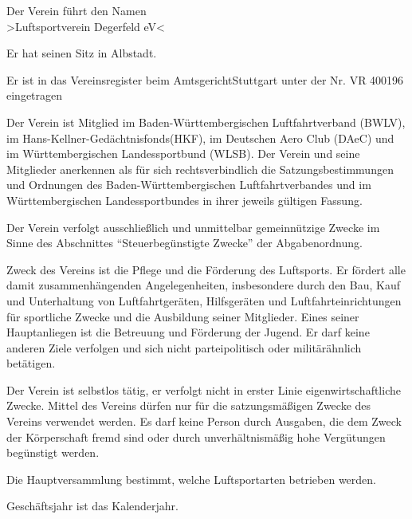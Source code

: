 \documentclass[11pt,a4paper,parskip=half]{scrartcl}
\begin{document}
	\begin{contract}
		\begin{multicols}{2}
		
		Der Verein führt den Namen\\
		>Luftsportverein Degerfeld eV<
		
		Er hat seinen Sitz in Albstadt.
		
		Er ist in das Vereinsregister beim AmtsgerichtStuttgart unter der Nr. VR 400196 eingetragen
		
		Der Verein ist Mitglied im Baden-Württembergischen Luftfahrtverband (BWLV), im Hans-Kellner-Gedächtnisfonds(HKF), im Deutschen		Aero Club (DAeC) und im Württembergischen
		Landessportbund (WLSB). Der Verein und seine		Mitglieder anerkennen als für sich
		rechtsverbindlich die Satzungsbestimmungen und		Ordnungen des Baden-Württembergischen
		Luftfahrtverbandes und im Württembergischen		Landessportbundes in ihrer jeweils gültigen
		Fassung.
		
		Der Verein verfolgt ausschließlich und		unmittelbar
		gemeinnützige Zwecke im Sinne des Abschnittes		"`Steuerbegünstigte Zwecke"' der Abgabenordnung.
		
		Zweck des Vereins ist die Pflege und die		Förderung des Luftsports. Er fördert alle damit
		zusammenhängenden Angelegenheiten,		insbesondere durch den Bau, Kauf und
		Unterhaltung von Luftfahrtgeräten, Hilfsgeräten		und Luftfahrteinrichtungen für sportliche Zwecke
		und die Ausbildung seiner Mitglieder. Eines seiner		Hauptanliegen ist die Betreuung und Förderung
		der Jugend. Er darf keine anderen Ziele verfolgen		und sich nicht parteipolitisch oder militärähnlich		betätigen.
		
		Der Verein ist selbstlos tätig, er verfolgt nicht in		erster Linie eigenwirtschaftliche Zwecke. Mittel des		Vereins dürfen nur für die satzungsmäßigen
		Zwecke des Vereins verwendet werden. Es darf		keine Person durch Ausgaben, die dem Zweck der
		Körperschaft fremd sind oder durch		unverhältnismäßig hohe Vergütungen begünstigt
		werden.
		
		Die Hauptversammlung bestimmt, welche		Luftsportarten betrieben werden.
		
		Geschäftsjahr ist das Kalenderjahr.
		
		

\end{multicols}
\end{contract}
\end{document}
